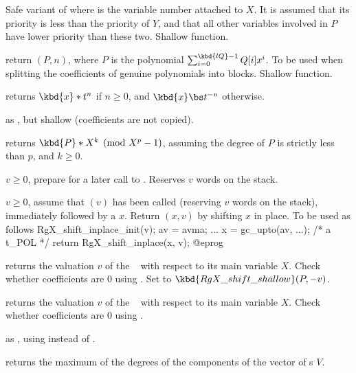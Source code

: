  Safe variant
of  where  is the variable number
attached to $X$. It is assumed that its priority is less than the priority of
$Y$, and that all other variables involved in $P$ have lower priority than
these two. Shallow function.

 return
$(P, n)$, where $P$ is the polynomial
$\sum_{i = 0}^{\kbd{lQ} - 1} Q[i] x^i$. To be used when splitting
the coefficients of genuine polynomials into blocks. Shallow function.



 returns $\kbd{x} * t^n$ if $n\geq 0$,
and $\kbd{x} \bs t^{-n}$ otherwise.

 as , but
shallow (coefficients are not copied).

 returns $\kbd{P} * X^k
\pmod {X^p-1}$, assuming the degree of $P$ is strictly less than $p$, and
$k\geq 0$.

 $v \geq 0$, prepare for a later
call to . Reserves $v$ words on the stack.

 $v \geq 0$, assume that
$(v)$ has been called (reserving $v$ words on the
stack), immediately followed by a  $x$. Return $(x,v)$
by shifting $x$ in place. To be used as follows
\bprog
  RgX_shift_inplace_init(v);
  av = avma;
  ...
  x = gc_upto(av, ...); /* a t_POL */
  return RgX_shift_inplace(x, v);
@eprog

 returns the valuation $v$ of the
~ with respect to its main variable $X$. Check whether
coefficients are $0$ using . Set  to
$\kbd{RgX\_shift\_shallow}(P,-v)$.

 returns the valuation $v$ of the
~ with respect to its main variable $X$. Check whether
coefficients are $0$ using .

 as , using
 instead of .

 returns the maximum of the degrees of
the components of the vector of s $V$.

